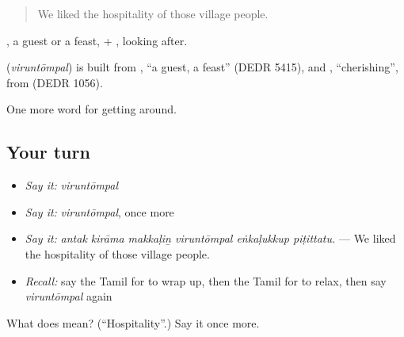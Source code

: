 \begin{quote}
We liked the hospitality of those village people.
\end{quote}

, a guest or a feast, + , looking after.

\begin{cousinweb}
\textbf{} (\emph{viruntōmpal}) is built from , \textquotedblleft{}a guest, a feast\textquotedblright{} (DEDR 5415), and , \textquotedblleft{}cherishing\textquotedblright{}, from  (DEDR 1056).
\end{cousinweb}

\begin{grammarlens}[title={What you've built}]
One more word for getting around.
\end{grammarlens}

\subsection*{Your turn}
\begin{itemize}
\raggedright
  \item \emph{Say it:} \emph{viruntōmpal}
  \item \emph{Say it:} \emph{viruntōmpal}, once more
  \item \emph{Say it:} \emph{antak kirāma makkaḷiṉ viruntōmpal eṅkaḷukkup piṭittatu.} — We liked the hospitality of those village people.
  \item \emph{Recall:} say the Tamil for to wrap up, then the Tamil for to relax, then say \emph{viruntōmpal} again
\end{itemize}

\begin{tcolorbox}[breakable,colback=teal!4,colframe=teal!35!black,title={Before you move on}]
What does  mean? (\textquotedblleft{}Hospitality\textquotedblright{}.) Say it once more.
\end{tcolorbox}
